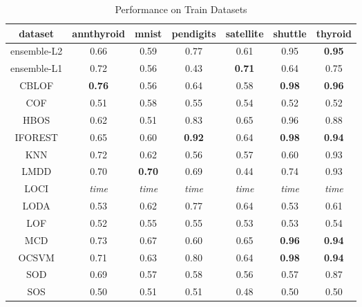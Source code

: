 \begin{table*}[!t]
\renewcommand{\arraystretch}{1.25}
\caption{Performance on Train Datasets}
\label{table:results:train-performance}
\centering
\begin{tabular}{|c|c|c|c|c|c|c|}
\hline
\textbf{dataset} & \textbf{annthyroid} & \textbf{mnist} & \textbf{pendigits} & \textbf{satellite} & \textbf{shuttle} & \textbf{thyroid} \\
\hline
ensemble-L2 & 0.66 & 0.59 & 0.77 & 0.61 & 0.95 & \bfseries 0.95 \\
\hline
ensemble-L1 & 0.72 & 0.56 & 0.43 & \bfseries 0.71 & 0.64 & 0.75 \\
\hline
CBLOF & \bfseries 0.76 & 0.56 & 0.64 & 0.58 & \bfseries 0.98 & \bfseries 0.96 \\
\hline
COF & 0.51 & 0.58 & 0.55 & 0.54 & 0.52 & 0.52 \\
\hline
HBOS & 0.62 & 0.51 & 0.83 & 0.65 & 0.96 & 0.88 \\
\hline
IFOREST & 0.65 & 0.60 & \bfseries 0.92 & 0.64 & \bfseries 0.98 & \bfseries 0.94 \\
\hline
KNN & 0.72 & 0.62 & 0.56 & 0.57 & 0.60 & 0.93 \\
\hline
LMDD & 0.70 & \bfseries 0.70 & 0.69 & 0.44 & 0.74 & 0.93 \\
\hline
LOCI & \textit{time} & \textit{time} & \textit{time} & \textit{time} & \textit{time} & \textit{time} \\
\hline
LODA & 0.53 & 0.62 & 0.77 & 0.64 & 0.53 & 0.61 \\
\hline
LOF & 0.52 & 0.55 & 0.55 & 0.53 & 0.53 & 0.54 \\
\hline
MCD & 0.73 & 0.67 & 0.60 & 0.65 & \bfseries 0.96 & \bfseries 0.94 \\
\hline
OCSVM & 0.71 & 0.63 & 0.80 & 0.64 & \bfseries 0.98 & \bfseries 0.94 \\
\hline
SOD & 0.69 & 0.57 & 0.58 & 0.56 & 0.57 & 0.87 \\
\hline
SOS & 0.50 & 0.51 & 0.51 & 0.48 & 0.50 & 0.50 \\
\hline
\end{tabular}
\end{table*}

